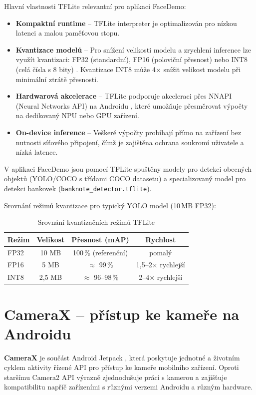 \documentclass[FM,BP,CZ]{tulthesis}
\begin{document}
Hlavní vlastnosti TFLite relevantní pro aplikaci FaceDemo:
\begin{itemize}
    \item \textbf{Kompaktní runtime} – TFLite interpreter je optimalizován pro nízkou latenci a malou paměťovou stopu.
    \item \textbf{Kvantizace modelů} – Pro snížení velikosti modelu a zrychlení inference lze využít kvantizaci: FP32 (standardní), FP16 (poloviční přesnost) nebo INT8 (celá čísla s 8 bity) \cite{tensorflow2015whitepaper}. Kvantizace INT8 může 4× snížit velikost modelu při minimální ztrátě přesnosti.
    \item \textbf{Hardwarová akcelerace} – TFLite podporuje akceleraci přes NNAPI (Neural Networks API) na Androidu \cite{nnapi2024}, které umožňuje přesměrovat výpočty na dedikovaný NPU nebo GPU zařízení.
    \item \textbf{On-device inference} – Veškeré výpočty probíhají přímo na zařízení bez nutnosti síťového připojení, čímž je zajištěna ochrana soukromí uživatele a nízká latence.
\end{itemize}
V aplikaci FaceDemo jsou pomocí TFLite spuštěny modely pro detekci obecných objektů (YOLO/COCO s třídami COCO datasetu) a specializovaný model pro detekci bankovek (\texttt{banknote\_detector.tflite}).

Srovnání režimů kvantizace pro typický YOLO model (10\,MB FP32):

\begin{table}[H]
\centering
\begin{tabular}{|l|c|c|c|}
\hline
\textbf{Režim} & \textbf{Velikost} & \textbf{Přesnost (mAP)} & \textbf{Rychlost} \\
\hline
FP32  & 10 MB & 100\,\% (referenční) & pomalý \\
FP16  & 5 MB  & \(\approx\) 99\,\%   & 1,5--2\(\times\) rychlejší \\
INT8  & 2,5 MB & \(\approx\) 96--98\,\% & 2--4\(\times\) rychlejší \\
\hline
\end{tabular}
\caption{Srovnání kvantizačních režimů TFLite}
\label{tab:quantization}
\end{table}

\section{CameraX – přístup ke kameře na Androidu}
\textbf{CameraX} je součást Android Jetpack \cite{camerax2024}, která poskytuje jednotné a životním cyklem aktivity řízené API pro přístup ke kameře mobilního zařízení. Oproti staršímu Camera2 API výrazně zjednodušuje práci s kamerou a zajišťuje kompatibilitu napříč zařízeními s různými verzemi Androidu a různým hardware.
\end{document}
